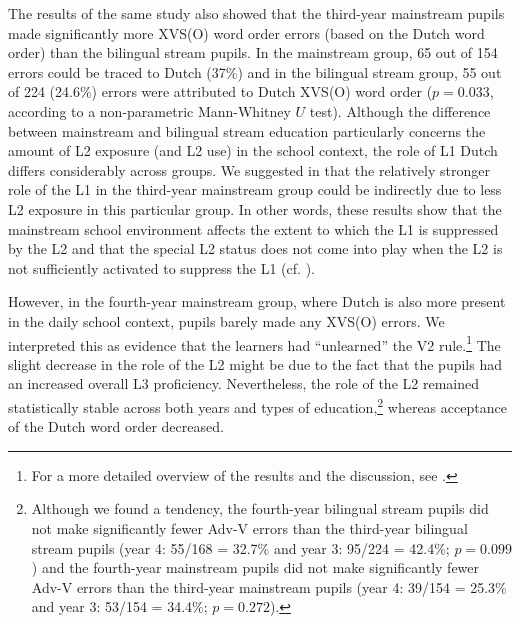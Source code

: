\documentclass[output=paper]{langsci/langscibook}
\begin{document}
\begin{table}
\caption{Adv-V and V2 errors in fourth-year bilingual (B) stream and mainstream (M) group\label{tab:stadt:3}}
\end{table}

The results of the same study also showed that the third-year mainstream pupils made significantly more XVS(O) word order errors (based on the Dutch word order) than the bilingual stream pupils. In the mainstream group, 65 out of 154 errors could be traced to Dutch (37\%) and in the bilingual stream group, 55 out of 224 (24.6\%) errors were attributed to Dutch XVS(O) word order ($p = 0.033$, according to a non-parametric Mann-Whitney $U$ test). Although the difference between mainstream and bilingual stream education particularly concerns the amount of L2 exposure (and L2 use) in the school context, the role of L1 Dutch differs considerably across groups. We suggested in \citet{StadtEtAl2016, StadtEtAl2018Exposure} that the relatively stronger role of the L1 in the third-year mainstream group could be indirectly due to less L2 exposure in this particular group. In other words, these results show that the mainstream school environment affects the extent to which the L1 is suppressed by the L2 and that the special L2 status does not come into play when the L2 is not sufficiently activated to suppress the L1 (cf. \citealt{Hammarberg2001}).

  However, in the fourth-year mainstream group, where Dutch is also more present in the daily school context, pupils barely made any XVS(O) errors. We interpreted this as evidence that the learners had ``unlearned'' the V2 rule.\footnote{For a more detailed overview of the results and the discussion, see \citet{StadtEtAl2016, StadtEtAl2018Exposure}.} The slight decrease in the role of the L2 might be due to the fact that the pupils had an increased overall L3 proficiency. Nevertheless, the role of the L2 remained statistically stable across both years and types of education,\footnote{Although we found a tendency, the fourth-year bilingual stream pupils did not make significantly fewer Adv-V errors than the third-year bilingual stream pupils (year 4: 55/168 = 32.7\% and year 3: 95/224 = 42.4\%; $p = 0.099$) and the fourth-year mainstream pupils did not make significantly fewer Adv-V errors than the third-year mainstream pupils (year 4: 39/154 = 25.3\% and year 3: 53/154 = 34.4\%; $p = 0.272$).} whereas acceptance of the Dutch word order decreased.
\end{document}
